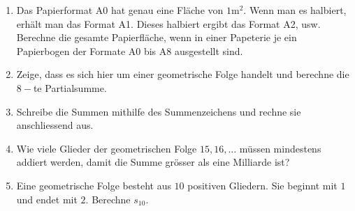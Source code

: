 \documentclass[11pt,oneside]{article}
\begin{document}
	\begin{aufgabe}
		\begin{enumerate}
			\item Das Papierformat A0 hat genau eine Fläche von $1$m$^2$. Wenn man es halbiert, erhält man das Format A1. Dieses halbiert ergibt das Format A2, usw.\newline
			Berechne die gesamte Papierfläche, wenn in einer Papeterie je ein Papierbogen der Formate A0 bis A8 ausgestellt sind.
			\item Zeige, dass es sich hier um einer geometrische Folge handelt und berechne die $8-$te Partialsumme. %
			\item Schreibe die Summen mithilfe des Summenzeichens und rechne sie anschliessend aus.
			\item Wie viele Glieder der geometrischen Folge $15,16,\ldots$ müssen mindestens addiert werden, damit die Summe grösser als eine Milliarde ist? %
			\item Eine geometrische Folge besteht aus $10$ positiven Gliedern. Sie beginnt mit $1$ und endet mit $2$. Berechne $s_{10}$. %
		\end{enumerate}
	\end{aufgabe}\newpage
\end{document}
